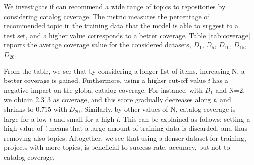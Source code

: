 


We investigate if \TFa can recommend a wide range of topics to repositories by considering catalog coverage. The metric measures the percentage of recommended topic in the training data that the model is able to suggest to a test set, and a higher value corresponds to a better coverage. 
Table~\ref{tab:coverage} reports the average coverage value for the considered datasets, \ie $D_{1}$, $D_{5}$, $D_{10}$, $D_{15}$, $D_{20}$. %



From the table, we see that by considering a longer list of items, \ie increasing N, a better coverage is gained. Furthermore, using a higher cut-off value \emph{t} has a negative impact on the global catalog coverage. For instance, with $D_{1}$ and N=2, we obtain 2.313 as coverage, and this score gradually decreases along \emph{t}, and shrinks to 0.715 with $D_{20}$. Similarly, by other values of N, catalog coverage is large for a low \emph{t} and small for a high \emph{t}. This can be explained as follows: setting a high value of \emph{t} means that a large amount of training data is discarded, and thus removing also topics. Altogether, we see that using a denser dataset for training, \ie projects with more topics, is beneficial to success rate, accuracy, but not to catalog coverage.



